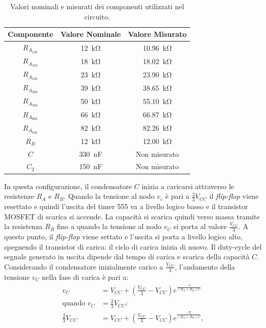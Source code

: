 \def\arraystretch{1.3}
\begin{table}[h!]
	\centering
	\begin{tabular}{|c|c|c|}
		\hline
		Componente	& Valore Nominale & Valore Misurato \\ \hline
		$R_{A_{12k}}$ &\SI{12}{\kilo\ohm} & \SI{10.96}{\kilo\ohm} \\ \hline
		$R_{A_{18k}}$ &\SI{18}{\kilo\ohm} & \SI{18.02}{\kilo\ohm} \\ \hline
		$R_{A_{23k}}$ &\SI{23}{\kilo\ohm} & \SI{23.90}{\kilo\ohm} \\ \hline
		$R_{A_{39k}}$ &\SI{39}{\kilo\ohm} & \SI{38.65}{\kilo\ohm} \\ \hline
		$R_{A_{50k}}$ &\SI{50}{\kilo\ohm} & \SI{55.10}{\kilo\ohm} \\ \hline
		$R_{A_{66k}}$ &\SI{66}{\kilo\ohm} & \SI{66.87}{\kilo\ohm} \\ \hline
		$R_{A_{82k}}$ &\SI{82}{\kilo\ohm} & \SI{82.26}{\kilo\ohm} \\ \hline
		$R_B$ &\SI{12}{\kilo\ohm} & \SI{12.00}{\kilo\ohm} \\ \hline
		$C$ & \SI{330}{\nano\farad} & Non misurato \\ \hline
		$C_2$ & \SI{150}{\nano\farad} & Non misurato \\ \hline
	\end{tabular}
	\caption{Valori nominali e misurati dei componenti utilizzati nel circuito.}
	\label{tab:valori_componenti_3}
\end{table}
In questa configurazione, il condensatore $C$ inizia a caricarsi attraverso le resistenze $R_A$ e $R_B$. Quando la tensione al nodo $v_c$ è pari a $\frac{2}{3}V_{CC}$ il \textit{flip-flop} viene resettato e quindi l'uscita del timer 555 va a livello logico basso e il transistor MOSFET di scarica si accende. La capacità si scarica quindi verso massa tramite la resistenza $R_B$ fino a quando la tensione al nodo $v_C$ si porta al valore $\frac{V_{CC}}{3}$. A questo punto, il \textit{flip-flop} viene settato e l'uscita si porta a livello logico alto, spegnendo il transistor di carica: il ciclo di carica inizia di nuovo. Il duty-cycle del segnale generato in uscita dipende dal tempo di carica e scarica della capacità $C$. Considerando il condensatore inizialmente carico a $\frac{V_{CC}}{3}$, l'andamento della tensione $v_C$ nella fase di carica è pari a:
\begin{equation}
	\begin{split}
		v_C&=V_{CC}+\left(\frac{V_{CC}}{3}-V_{CC}\right)e^{\frac{-t}{\left(R_A+R_B\right)C}} \\
		\text{quando }v_C&=\frac{2}{3}V_{CC}\text{:} \\
		\frac{2}{3}V_{CC}&=V_{CC}+\left(\frac{V_{CC}}{3}-V_{CC}\right)e^{\frac{-T_1}{\left(R_A+R_B\right)C}}, \\
	\end{split}
\end{equation}
